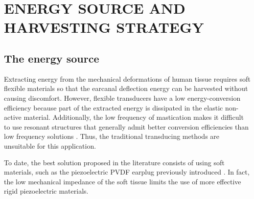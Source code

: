 \documentclass[3p,twocolumn,preprint]{elsarticle}
\begin{document}
\section{ENERGY SOURCE AND HARVESTING STRATEGY}
\label{sec:THE ENERGY SOURCE AND HARVESTING STRATEGY}
	\subsection{The energy source}	
	\label{The energy source}
Extracting energy from the mechanical deformations of human tissue requires soft flexible materials so that the earcanal deflection energy can be harvested without causing discomfort. However, flexible transducers have a low energy-conversion efficiency because part of the extracted energy is dissipated in the elastic non-active material. Additionally, the low frequency of mastication makes it difficult to use resonant structures that generally admit better conversion efficiencies than low frequency solutions \cite{Ashraf2011}. Thus, the traditional transducing methods are unsuitable for this application.

To date, the best solution proposed in the literature consists of using soft materials, such as the piezoelectric PVDF earplug previously introduced \cite{Delnavaz2013}. In fact, the low mechanical impedance of the soft tissue limits the use of more effective rigid piezoelectric materials.
\end{document}
